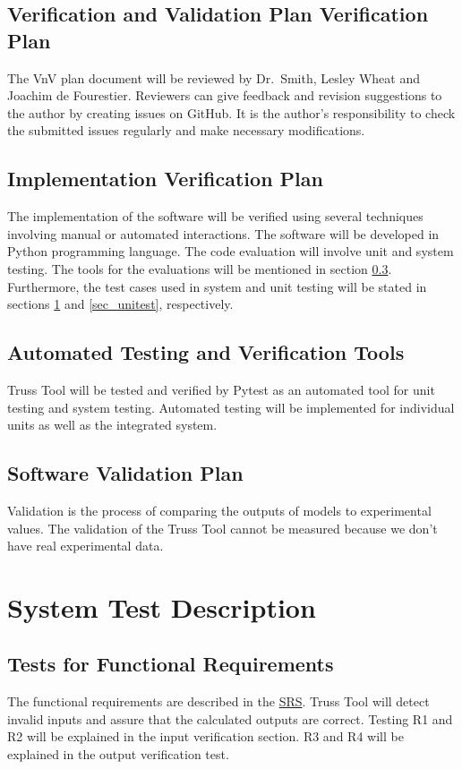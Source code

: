 \documentclass[12pt, titlepage]{article}
\begin{document}
\subsection{Verification and Validation Plan Verification Plan} \label{Sec_VofVnV}
The VnV plan document will be reviewed by Dr.\  Smith, Lesley Wheat and Joachim de Fourestier. Reviewers can give feedback and revision suggestions to the author by creating issues on GitHub. It is the author's responsibility to check the submitted issues regularly and make necessary modifications.
\subsection{Implementation Verification Plan} \label{Sec_implementation}
The implementation of the software will be verified using several techniques involving manual or automated interactions. The software will be developed in Python programming language. The code evaluation will involve unit and system testing. The tools for the
evaluations will be mentioned in section \ref{sec_automat}. Furthermore, the test cases used in system and unit testing will be stated in sections \ref{sec_systest} and \ref{sec_unitest}, respectively.

\subsection{Automated Testing and Verification Tools} \label{sec_automat}
Truss Tool will be tested and verified by Pytest as an automated tool for unit testing and system testing. Automated testing will be implemented for individual units as well as the integrated system.

\subsection{Software Validation Plan}
 Validation is the process of comparing the outputs of models to experimental values. The validation of the Truss Tool cannot be measured because we don't have real experimental data. 
\section{System Test Description} \label{sec_systest}
	
\subsection{Tests for Functional Requirements}
The functional requirements are described in the \href{https://github.com/Maryamvalian/project741/blob/main/docs/SRS/SRS.pdf}{SRS}. Truss Tool will detect invalid inputs and assure that the calculated outputs are correct. Testing R1 and R2 will be explained in the input verification section. R3 and R4 will be explained in the output verification test. 
\end{document}
